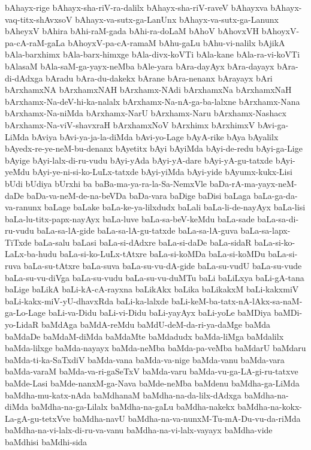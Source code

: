 {bAhayx-rige
bAhayx-sha-riV-ra-dalilx
bAhayx-sha-riV-raveV
bAhayxva
bAhayx-vaq-titx-shAvxsoV
bAhayx-va-sutx-ga-LanUnx
bAhayx-va-sutx-ga-Lanunx
bAheyxV
bAhira
bAhi-raM-gada
bAhi-ra-doLaM
bAhoV
bAhovxVH
bAhoyxV-pa-cA-raM-gaLa
bAhoyxV-pa-cA-ramaM
bAhu-gaLu
bAhu-vi-nalilx
bAjikA
bAla-barxhimx
bAla-barx-himxge
bAla-divx-koVTi
bAla-kane
bAla-ra-vi-koVTi
bAlasaM
bAla-saM-ga-yayx-neMba
bAle-yara
bAra-dayAyx
bAra-dayayx
bAra-di-dAdxga
bAradu
bAra-du-dakekx
bArane
bAra-nenanx
bArayayx
bAri
bArxhamxNA
bArxhamxNAH
bArxhamx-NAdi
bArxhamxNa
bArxhamxNaH
bArxhamx-Na-deV-hi-ka-nalalx
bArxhamx-Na-nA-ga-ba-lalxne
bArxhamx-Nana
bArxhamx-Na-niMda
bArxhamx-NarU
bArxhamx-Naru
bArxhamx-Nashacx
bArxhamx-Na-viV-shavxraH
bArxhamxNoV
bArxhimx
bArxhimxV
bAvi-ga-LiMda
bAviya
bAvi-ya-ja-la-diMda
bAvi-yo-Lage
bAyA-rike
bAya
bAyalilx
bAyedx-re-ye-neM-bu-denanx
bAyetitx
bAyi
bAyiMda
bAyi-de-redu
bAyi-ga-Lige
bAyige
bAyi-lalx-di-ru-vudu
bAyi-yAda
bAyi-yA-dare
bAyi-yA-gu-tatxde
bAyi-yeMdu
bAyi-ye-ni-si-ko-LuLx-tatxde
bAyi-yiMda
bAyi-yide
bAyumx-kukx-Lisi
bUdi
bUdiya
bUrxhi
ba
baBa-ma-ya-ra-la-Sa-NemxVle
baDa-rA-ma-yayx-neM-daDe
baDa-va-neM-de-na-beVDa
baDa-vara
baDige
baDisi
baLaga
baLa-ga-da-va-ranunx
baLage
baLake
baLa-ke-ya-lilxdudx
baLali
baLa-li-de-nayAyx
baLa-lisi
baLa-lu-titx-papx-nayAyx
baLa-luve
baLa-sa-beV-keMdu
baLa-sade
baLa-sa-di-ru-vudu
baLa-sa-lA-gide
baLa-sa-lA-gu-tatxde
baLa-sa-lA-guva
baLa-sa-lapx-TiTxde
baLa-salu
baLasi
baLa-si-dAdxre
baLa-si-daDe
baLa-sidaR
baLa-si-ko-LaLx-ba-hudu
baLa-si-ko-LuLx-tAtxre
baLa-si-koMDa
baLa-si-koMDu
baLa-si-ruva
baLa-su-tAtxre
baLa-suva
baLa-su-vu-dA-gide
baLa-su-vudU
baLa-su-vude
baLa-su-vu-diVga
baLa-su-vudu
baLa-su-vu-duMTu
baLi
baLiLxya
baLi-gA-tana
baLige
baLikA
baLi-kA-cA-rayxna
baLikAkx
baLika
baLikakxM
baLi-kakxmiV
baLi-kakx-miV-yU-dhavxRda
baLi-ka-lalxde
baLi-keM-ba-tatx-nA-lAkx-sa-naM-ga-Lo-Lage
baLi-va-Didu
baLi-vi-Didu
baLi-yayAyx
baLi-yoLe
baMDiya
baMDi-yo-LidaR
baMdAga
baMdA-reMdu
baMdU-deM-da-ri-ya-daMge
baMda
baMdaDe
baMdaM-diMda
baMdaMte
baMdadudx
baMda-liMga
baMdalilx
baMda-lilxge
baMda-nayayx
baMda-neMba
baMda-pa-veMba
baMdarU
baMdaru
baMda-ti-ka-SaTxdiV
baMda-vana
baMda-va-nige
baMda-vanu
baMda-vara
baMda-varaM
baMda-va-ri-gaSeTxV
baMda-varu
baMda-vu-ga-LA-gi-ru-tatxve
baMde-Lasi
baMde-nanxM-ga-Nava
baMde-neMba
baMdenu
baMdha-ga-LiMda
baMdha-mu-katx-nAda
baMdhanaM
baMdha-na-da-lilx-dAdxga
baMdha-na-diMda
baMdha-na-ga-Lilalx
baMdha-na-gaLu
baMdha-nakekx
baMdha-na-kokx-La-gA-gu-tetxVve
baMdha-navU
baMdha-na-va-nunxM-Tu-mA-Du-vu-da-riMda
baMdha-na-vi-lalx-di-ru-va-vanu
baMdha-na-vi-lalx-vayayx
baMdha-vide
baMdhisi
baMdhi-sida
}
